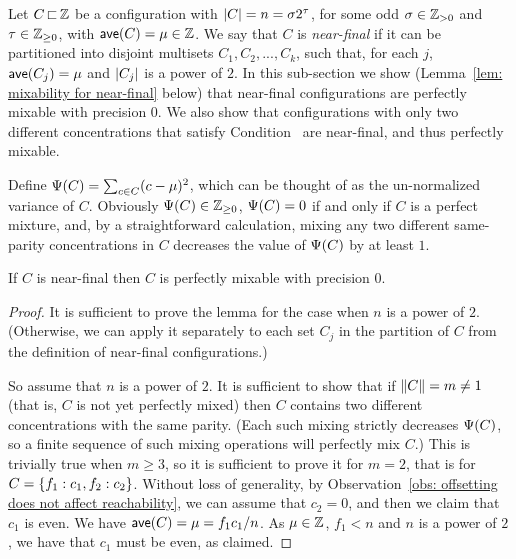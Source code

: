 

%

Let $C{\,\sqsubset\,}{\mathbb Z}$ be a configuration with
${|C|} = n = \sigma 2^\tau$, for some odd $\sigma\in{\mathbb{Z}_{> 0}}$ and $\tau\in{\mathbb{Z}_{\ge 0}}$,
with ${\textsf{ave}}(C) = \mu\in{\mathbb Z}$.
We say that $C$ is \emph{near-final} if it can be partitioned
into disjoint multisets $C_1,C_2,...,C_k$, such that, for each $j$,
${\textsf{ave}}(C_j) = \mu$ and ${|C_j|}$ is a power of $2$.
In this sub-section we show (Lemma~\ref{lem: mixability for near-final} below)
that near-final configurations are perfectly mixable with precision $0$.
We also show that configurations with
only two different concentrations that satisfy Condition~{\MixCond} are near-final,
and thus perfectly mixable.

Define ${\Psi}(C) = \sum_{c\in C}(c - \mu)^2$, which can be thought of as the
un-normalized variance of $C$. Obviously ${\Psi}(C) \in {\mathbb{Z}_{\ge 0}}$,
${\Psi}(C)=0$ if and only if $C$ is a perfect mixture,
and, by a straightforward calculation, mixing any two different same-parity concentrations in $C$ 
decreases the value of ${\Psi}(C)$ by at least $1$.


\begin{lemma}\label{lem: mixability for near-final} 
	If $C$ is near-final
	then $C$ is perfectly mixable with precision $0$.
\end{lemma}

\begin{proof}
It is sufficient to prove the lemma for the case when $n$ is a power
of $2$. (Otherwise, we can apply it separately to each set $C_j$ in the 
partition of $C$ from the definition of near-final configurations.)	

So assume that $n$ is a power of $2$.
It is sufficient to show that if ${\|C\|} = m \neq 1$ (that is,
$C$ is not yet perfectly mixed) then $C$ contains
	two different concentrations with the same parity. 
	(Each such mixing strictly decreases ${\Psi}(C)$, so a finite sequence
	of such mixing operations will perfectly mix $C$.)
	This is trivially true when $m\geq 3$,
	so it is sufficient to prove it for $m=2$,
	that is for $C = { \left\{ f_1:c_1, f_2:c_2 \right\} }$. Without loss of generality, 
	by Observation~\ref{obs: offsetting does not affect reachability},
	we can assume that $c_2 = 0$,
	and then we claim that $c_1$ is even.
	We have ${\textsf{ave}}(C) = \mu = f_1 c_1/n$.
	As $\mu\in{\mathbb Z}$, $f_1 < n$ and $n$ is a power of $2$,
	we have that $c_1$ must be even, as claimed.
\end{proof}

